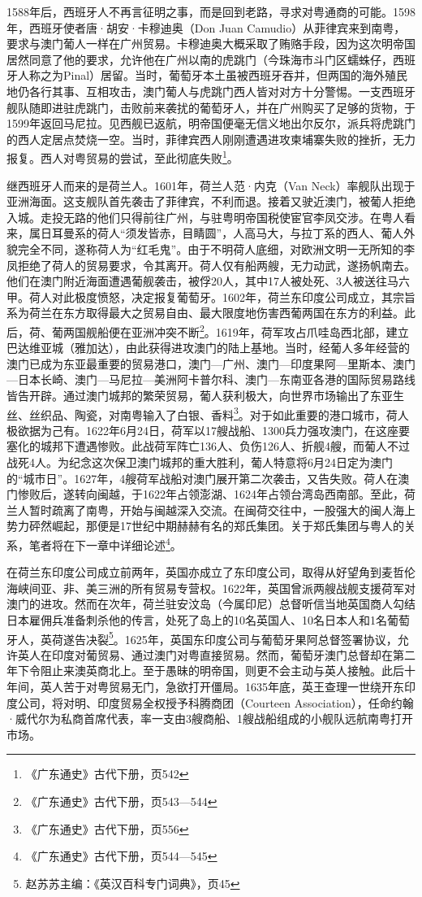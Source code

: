 1588年后，西班牙人不再言征明之事，而是回到老路，寻求对粤通商的可能。1598年，西班牙使者唐·胡安·卡穆迪奥（Don Juan Camudio）从菲律宾来到南粤，要求与澳门葡人一样在广州贸易。卡穆迪奥大概采取了贿赂手段，因为这次明帝国居然同意了他的要求，允许他在广州以南的虎跳门（今珠海市斗门区蠕蛛仔，西班牙人称之为Pinal）居留。当时，葡萄牙本土虽被西班牙吞并，但两国的海外殖民地仍各行其事、互相攻击，澳门葡人与虎跳门西人皆对对方十分警惕。一支西班牙舰队随即进驻虎跳门，击败前来袭扰的葡萄牙人，并在广州购买了足够的货物，于1599年返回马尼拉。见西舰已返航，明帝国便毫无信义地出尔反尔，派兵将虎跳门的西人定居点焚烧一空。当时，菲律宾西人刚刚遭遇进攻柬埔寨失败的挫折，无力报复。西人对粤贸易的尝试，至此彻底失败\footnote{《广东通史》古代下册，页542}。

继西班牙人而来的是荷兰人。1601年，荷兰人范·内克（Van Neck）率舰队出现于亚洲海面。这支舰队首先袭击了菲律宾，不利而退。接着又驶近澳门，被葡人拒绝入城。走投无路的他们只得前往广州，与驻粤明帝国税使宦官李凤交涉。在粤人看来，属日耳曼系的荷人“须发皆赤，目睛圆”，人高马大，与拉丁系的西人、葡人外貌完全不同，遂称荷人为“红毛鬼”。由于不明荷人底细，对欧洲文明一无所知的李凤拒绝了荷人的贸易要求，令其离开。荷人仅有船两艘，无力动武，遂扬帆南去。他们在澳门附近海面遭遇葡舰袭击，被俘20人，其中17人被处死、3人被送往马六甲。荷人对此极度愤怒，决定报复葡萄牙。1602年，荷兰东印度公司成立，其宗旨系为荷兰在东方取得最大之贸易自由、最大限度地伤害西葡两国在东方的利益。此后，荷、葡两国舰船便在亚洲冲突不断\footnote{《广东通史》古代下册，页543—544}。1619年，荷军攻占爪哇岛西北部，建立巴达维亚城（雅加达），由此获得进攻澳门的陆上基地。当时，经葡人多年经营的澳门已成为东亚最重要的贸易港口，澳门—广州、澳门—印度果阿—里斯本、澳门—日本长崎、澳门—马尼拉—美洲阿卡普尔科、澳门—东南亚各港的国际贸易路线皆告开辟。通过澳门城邦的繁荣贸易，葡人获利极大，向世界市场输出了东亚生丝、丝织品、陶瓷，对南粤输入了白银、香料\footnote{《广东通史》古代下册，页556}。对于如此重要的港口城市，荷人极欲据为己有。1622年6月24日，荷军以17艘战船、1300兵力强攻澳门，在这座要塞化的城邦下遭遇惨败。此战荷军阵亡136人、负伤126人、折舰4艘，而葡人不过战死4人。为纪念这次保卫澳门城邦的重大胜利，葡人特意将6月24日定为澳门的“城市日”。1627年，4艘荷军战船对澳门展开第二次袭击，又告失败。荷人在澳门惨败后，遂转向闽越，于1622年占领澎湖、1624年占领台湾岛西南部。至此，荷兰人暂时疏离了南粤，开始与闽越深入交流。在闽荷交往中，一股强大的闽人海上势力砰然崛起，那便是17世纪中期赫赫有名的郑氏集团。关于郑氏集团与粤人的关系，笔者将在下一章中详细论述\footnote{《广东通史》古代下册，页544—545}。

在荷兰东印度公司成立前两年，英国亦成立了东印度公司，取得从好望角到麦哲伦海峡间亚、非、美三洲的所有贸易专营权。1622年，英国曾派两艘战舰支援荷军对澳门的进攻。然而在次年，荷兰驻安汶岛（今属印尼）总督听信当地英国商人勾结日本雇佣兵准备刺杀他的传言，处死了岛上的10名英国人、10名日本人和1名葡萄牙人，英荷遂告决裂\footnote{赵苏苏主编：《英汉百科专门词典》，页45}。1625年，英国东印度公司与葡萄牙果阿总督签署协议，允许英人在印度对葡贸易、通过澳门对粤直接贸易。然而，葡萄牙澳门总督却在第二年下令阻止来澳英商北上。至于愚昧的明帝国，则更不会主动与英人接触。此后十年间，英人苦于对粤贸易无门，急欲打开僵局。1635年底，英王查理一世绕开东印度公司，将对明、印度贸易全权授予科腾商团（Courteen Association），任命约翰·威代尔为私商首席代表，率一支由3艘商船、1艘战船组成的小舰队远航南粤打开市场。

